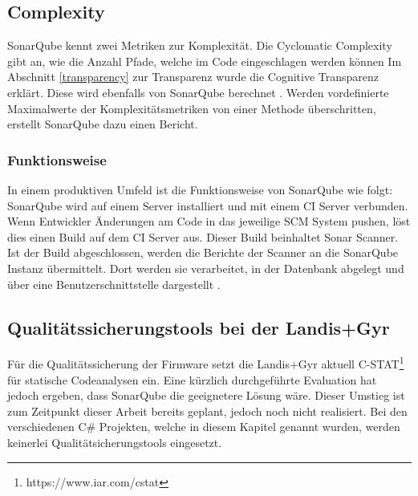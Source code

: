 \subsection{Complexity}
SonarQube kennt zwei Metriken zur Komplexität.
Die Cyclomatic Complexity gibt an, wie die Anzahl Pfade, welche im Code eingeschlagen werden können
Im Abschnitt \ref{transparency} zur Transparenz wurde die Cognitive Transparenz erklärt. 
Diese wird ebenfalls von SonarQube berechnet \parencite{sonarQubeMetrics}.
Werden vordefinierte Maximalwerte der Komplexitätsmetriken von einer Methode überschritten, erstellt SonarQube dazu einen Bericht.


\subsubsection{Funktionsweise}\label{sonar:funktionsweise}
In einem produktiven Umfeld ist die Funktionsweise von SonarQube wie folgt:
SonarQube wird auf einem Server installiert und mit einem \ac{CI} Server verbunden.
Wenn Entwickler Änderungen am Code in das jeweilige \ac{SCM} System pushen, löst dies einen Build auf dem \ac{CI} Server aus.
Dieser Build beinhaltet Sonar Scanner.
Ist der Build abgeschlossen, werden die Berichte der Scanner an die SonarQube Instanz übermittelt.
Dort werden sie verarbeitet, in der Datenbank abgelegt und über eine Benutzerschnittstelle dargestellt \parencite{malloy_2021}.

\subsection{Qualitätssicherungstools bei der Landis+Gyr}
Für die Qualitätssicherung der Firmware setzt die Landis+Gyr aktuell C-STAT\footnote{https://www.iar.com/cstat} für statische Codeanalysen ein.
Eine kürzlich durchgeführte Evaluation hat jedoch ergeben, dass SonarQube die geeignetere Lösung wäre.
Dieser Umstieg ist zum Zeitpunkt dieser Arbeit bereits geplant, jedoch noch nicht realisiert.
Bei den verschiedenen C\# Projekten, welche in diesem Kapitel genannt wurden, werden keinerlei Qualitätsicherungstools eingesetzt.

